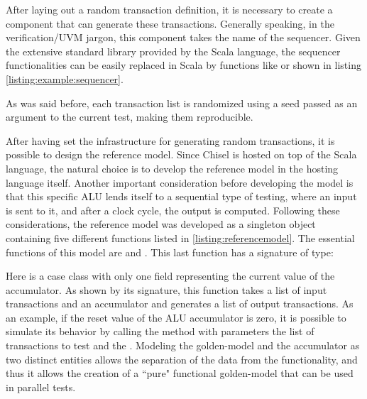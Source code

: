 After laying out a random transaction definition, it is necessary to create a
component that can generate these transactions. Generally speaking, in the
verification/UVM jargon, this component takes the name of the sequencer. Given
the extensive standard library provided by the Scala language, the sequencer
functionalities can be easily replaced in Scala by functions like  or
 shown in listing \ref{listing:example:sequencer}.

As was said before, each transaction list is randomized using a seed passed as
an argument to the current test, making them reproducible.

After having set the infrastructure for generating random transactions, it is
possible to design the reference model. Since Chisel is hosted on top of the
Scala language, the natural choice is to develop the reference model in the
hosting language itself. Another important consideration before developing the
model is that this specific ALU lends itself to a sequential type of testing,
where an input is sent to it, and after a clock cycle, the output is computed.
Following these considerations, the reference model was developed as a singleton
object containing five different functions listed in
\ref{listing:referencemodel}. The essential functions of this model are
 and . This last function has a
signature of type:

Here  is a case class with only one field 
representing the current value of the accumulator. As shown by its signature,
this function takes a list of input transactions and an accumulator and
generates a list of output transactions. As an example, if the reset value of
the ALU accumulator is zero, it is possible to simulate its behavior by calling
the  method with parameters the list of
transactions to test and the . Modeling the golden-model
and the accumulator as two distinct entities allows the separation of the data
from the functionality, and thus it allows the creation of a ``pure" functional
golden-model that can be used in parallel tests.

